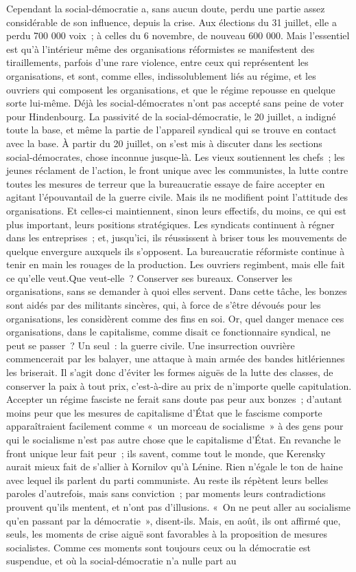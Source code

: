 \documentclass[french,twoside]{book} %
\begin{document}
Cependant la social-démocratie a, sans aucun doute, perdu une partie assez considérable de son influence, depuis la crise. Aux élections du 31 juillet, elle a perdu 700 000 voix ; à celles du 6 novembre, de nouveau 600 000. Mais l'essentiel est qu'à l'intérieur même des organisations réformistes se manifes­tent des tiraillements, parfois d'une rare violence, entre ceux qui représentent les organisations, et sont, comme elles, indissolublement liés au régime, et les ouvriers qui composent les organisations, et que le régime repousse en quel­que sorte lui-même. Déjà les social-démocrates n'ont pas accepté sans peine de voter pour Hindenbourg. La passivité de la social-démocratie, le 20 juillet, a indigné toute la base, et même la partie de l'appareil syndical qui se trouve en contact avec la base. À partir du 20 juillet, on s'est mis à discuter dans les sections social-démocrates, chose inconnue jusque-là. Les vieux soutiennent les chefs ; les jeunes réclament de l'action, le front unique avec les commu­nistes, la lutte contre toutes les mesures de terreur que la bureaucratie essaye de faire accepter en agitant l'épouvantail de la guerre civile. Mais ils ne modifient point l'attitude des organisations. Et celles-ci maintiennent, sinon leurs effectifs, du moins, ce qui est plus important, leurs positions straté­giques. Les syndicats continuent à régner dans les entreprises ; et, jusqu'ici, ils réussissent à briser tous les mouvements de quelque envergure auxquels ils s'opposent. La bureaucratie réformiste continue à tenir en main les rouages de la production. Les ouvriers regimbent, mais elle fait ce qu’elle veut.Que veut-elle ? Conserver ses bureaux. Conserver les organisations, sans se demander à quoi elles servent. Dans cette tâche, les bonzes sont aidés par des militants sincères, qui, à force de s'être dévoués pour les organisations, les considèrent comme des fins en soi. Or, quel danger menace ces organisations, dans le capitalisme, comme disait ce fonctionnaire syndical, ne peut se passer ? Un seul : la guerre civile. Une insurrection ouvrière commencerait par les balayer, une attaque à main armée des bandes hitlériennes les briserait. Il s'agit donc d'éviter les formes aiguës de la lutte des classes, de conserver la paix à tout prix, c'est-à-dire au prix de n'importe quelle capitulation. Accepter un régime fasciste ne ferait sans doute pas peur aux bonzes ; d'autant moins peur que les mesures de capitalisme d'État que le fascisme comporte apparaîtraient facile­ment comme « un morceau de socialisme » à des gens pour qui le socialisme n'est pas autre chose que le capitalisme d'État. En revanche le front unique leur fait peur ; ils savent, comme tout le monde, que Kerensky aurait mieux fait de s'allier à Kornilov qu'à Lénine. Rien n'égale le ton de haine avec lequel ils parlent du parti communiste. Au reste ils répètent leurs belles paroles d'autrefois, mais sans conviction ; par moments leurs contradictions prouvent qu'ils mentent, et n'ont pas d'illusions. « On ne peut aller au socialisme qu'en passant par la démocratie », disent-ils. Mais, en août, ils ont affirmé que, seuls, les moments de crise aiguë sont favorables à la proposition de mesures socialistes. Comme ces moments sont toujours ceux ou la démocratie est suspendue, et où la social-démocratie n'a nulle part au 
\end{document}
